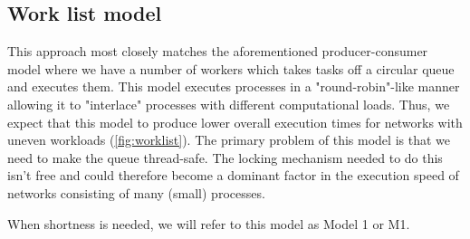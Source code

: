 

\subsection{Work list model}
This approach most closely matches the aforementioned producer-consumer model where we
have a number of workers which takes tasks off a circular queue and
executes them. This model executes processes in a
"round-robin"-like manner allowing it to "interlace" processes
with different computational loads. Thus, we expect that this model to
produce lower overall execution times for networks with uneven
workloads (\cref{fig:worklist}). The primary problem of this model is
that we need to make the queue thread-safe. The locking mechanism
needed to do this isn't free and could therefore become a dominant
factor in the execution speed of networks consisting of many (small)
processes.

When shortness is needed, we will refer to this model as Model 1 or
M1.

